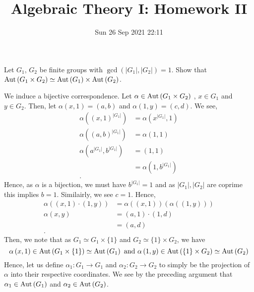 \documentclass[a4paper]{article}
\title{Algebraic Theory I: Homework II}
\date{Sun 26 Sep 2021 22:11}
\begin{document}
\maketitle
\begin{problem}[1]
	Let \(G_1\), \(G_2\) be finite groups with \(\gcd\left( \left| G_1 \right| , \left| G_2 \right|  \right) = 1\). Show that \(\operatorname{Aut}\left( G_1 \times G_2 \right)  \simeq \operatorname{Aut}\left( G_1 \right) \times \operatorname{Aut}\left( G_2 \right) \).
\end{problem}
\begin{solution}
	We induce a bijective correspondence. Let \(\alpha \in \operatorname{Aut}\left( G_1 \times G_2 \right) \) , \(x \in G_1\) and \(y \in G_2\). Then, let \(\alpha\left( x, 1 \right) = \left( a, b \right) \) and \(\alpha\left( 1, y \right)  = \left( c, d \right) \). We see,
\begin{align*}
	\alpha\left( \left( x, 1 \right) ^{\left| G_1 \right| } \right) &= \alpha\left( x^{\left| G_1 \right| }, 1 \right)  \\
	\alpha\left( \left( a, b \right) ^{\left| G_1 \right| } \right) &= \alpha\left( 1, 1 \right)  \\
	\alpha\left( a^{\left| G_1 \right| }, b^{\left| G_1 \right| } \right) &= \left( 1, 1 \right)  \\
									      &= \alpha\left( 1, b^{\left| G_1 \right| } \right)  \\
.\end{align*}
Hence, as \(\alpha\) is a bijection, we must have \(b^{\left| G_1 \right| } = 1\) and as \(\left| G_1 \right| , \left| G_2 \right|  \) are coprime this implies \( b = 1\). Similairly, we see \(c = 1\). Hence,
\begin{align*}
	\alpha\left( \left( x, 1 \right) \cdot \left( 1, y \right)  \right) &= \alpha\left( \left( x, 1 \right)  \right) \left( \alpha\left( \left( 1, y \right)  \right)  \right)  \\
	\alpha\left(  x, y   \right) &= \left( a, 1 \right) \cdot \left( 1, d \right)  \\
				     &=  \left( a, d \right) \\
.\end{align*}
Then, we note that as \(G_1 \simeq G_1 \times \{1\} \) and \(G_2 \simeq \{1\} \times G_2\), we have \[\alpha\left( x, 1 \right) \in \operatorname{Aut}\left( G_1 \times \{ 1\}  \right) \simeq \operatorname{Aut}\left( G_1 \right) \text{ and  }\alpha\left( 1, y \right) \in \operatorname{Aut}\left( \{1\} \times G_2 \right) \simeq \operatorname{Aut}\left( G_2 \right) \] Hence, let us define \(\alpha_1: G_1 \to G_1\) and \(\alpha_2 : G_2 \to G_2\) to simply be the projection of \(\alpha\) into their respective coordinates. We see by the preceding argument that \(\alpha_1 \in \operatorname{Aut}\left( G_1 \right) \) and \(\alpha_2 \in \operatorname{Aut}\left( G_2 \right) \).\\

\end{solution}
\end{document}
